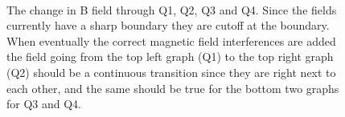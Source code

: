 \documentclass[letter,11pt]{article}
\begin{document}
\begin{figure}
\centering
	\\
	\caption{The change in B field through Q1, Q2, Q3 and Q4. Since the fields currently have a sharp boundary they are cutoff at the boundary. When eventually the correct magnetic field interferences are added the field going from the top left graph (Q1) to the top right graph (Q2) should be a continuous transition since they are right next to each other, and the same should be true for the bottom two graphs for Q3 and Q4.}
	\label{fig:quads}
\end{figure}
\end{document}
